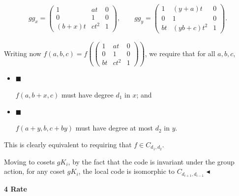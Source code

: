\documentclass[10pt,a4paper]{article}
\begin{document}
\[\begin{gathered}
gg_{x}=\begin{pmatrix}1&at&0\\
0&1&0\\
(b+x)t&ct^{2}&1\end{pmatrix},\qquad gg_{y}=\begin{pmatrix}1&(y+a)t&0\\
0&1&0\\
bt&(yb+c)t^{2}&1\end{pmatrix}.
\end{gathered}\]


Writing now $f(a,b,c)=f\left(\begin{pmatrix}1&at&0\\
0&1&0\\
bt&ct^{2}&1\end{pmatrix}\right)$, we require that for all $a,b,c$,\par


\begin{itemize}


\item[] 
$\blacksquare$ 


$f(a,b+x,c)$ must have degree $d_{1}$ in $x$; and\par





\item[] 
$\blacksquare$ 


$f(a+y,b,c+by)$ must have degree at most $d_{2}$ in $y$.\par





\end{itemize}


This is clearly equivalent to requiring that $f\in C_{d_{1},d_{2}}$.\par




Moving to cosets $gK_{i}$, by the fact that the code is invariant under the group action, for any coset $gK_{i}$, the local code is isomorphic to $C_{d_{i+1},d_{i-1}}$
$\blacktriangleleft$\par







\par\medskip\noindent\textbf{
4 Rate}\par
\end{document}
